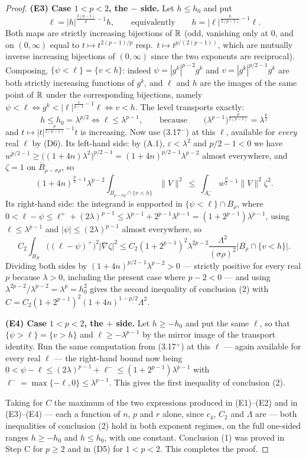 \begin{proof}
\textbf{(E3) Case $1<p<2$, the $-$ side.}  Let $h\le h_0$ and put
\[
\ell=|h|^{\frac{2(p-1)}p-1}h ,
\qquad\text{equivalently}\qquad
h=|\ell|^{\frac p{2(p-1)}-1}\ell .
\]
Both maps are strictly increasing bijections of $\mathbb{R}$ (odd, vanishing only at
$0$, and on $(0,\infty)$ equal to $t\mapsto t^{2(p-1)/p}$ resp.\
$t\mapsto t^{p/(2(p-1))}$, which are mutually inverse increasing bijections of
$(0,\infty)$ since the two exponents are reciprocal).  Composing,
$\{\psi<\ell\}=\{v<h\}$: indeed $\psi=|g^k|^{p-2}g^k$ and $v=|g^k|^{p/2-1}g^k$
are both strictly increasing functions of $g^k$, and $\ell$ and $h$ are the
images of the same point of $\mathbb{R}$ under the corresponding bijections, namely
$\psi<\ell\iff g^k<|\ell|^{\frac1{p-1}-1}\ell\iff v<h$.  The level transports
exactly:
\[
h\le h_0=\lambda^{p/2}\iff\ell\le\lambda^{p-1},
\qquad\text{because}\qquad
\bigl(\lambda^{p-1}\bigr)^{\frac p{2(p-1)}}=\lambda^{\frac p2}
\]
and $t\mapsto|t|^{\frac p{2(p-1)}-1}t$ is increasing.  Now use (3.17$^-$) at
this $\ell$, available for \emph{every} real $\ell$ by (D6).  Its left-hand
side: by (A.1), $\varepsilon<\lambda^2$ and $p/2-1<0$ we have
$w^{p/2-1}\ge\bigl((1+4n)\lambda^2\bigr)^{p/2-1}=(1+4n)^{p/2-1}\lambda^{p-2}$
almost everywhere, and $\zeta=1$ on $\overline B_{\rho-\sigma\rho}$, so
\[
(1+4n)^{\frac p2-1}\lambda^{p-2}
\int_{B_{\rho-\sigma\rho}\cap\{v<h\}}\|V\|^2
\ \le\ \int_{A^-_\ell}w^{\frac p2-1}\|V\|^2\zeta^2 .
\]
Its right-hand side: the integrand is supported in $\{\psi<\ell\}\cap B_\rho$,
where $0<\ell-\psi\le\ell^++(2\lambda)^{p-1}\le\lambda^{p-1}
+2^{p-1}\lambda^{p-1}=(1+2^{p-1})\lambda^{p-1}$, using $\ell\le\lambda^{p-1}$
and $|\psi|\le(2\lambda)^{p-1}$ almost everywhere, so
\[
C_2\int_{B_R}\bigl((\ell-\psi)^+\bigr)^2|\nabla\zeta|^2
\le C_2(1+2^{p-1})^2\lambda^{2p-2}\frac{\Lambda^2}{(\sigma\rho)^2}
\bigl|B_\rho\cap\{v<h\}\bigr| .
\]
Dividing both sides by $(1+4n)^{p/2-1}\lambda^{p-2}>0$ --- strictly positive for
every real $p$ because $\lambda>0$, including the present case where $p-2<0$ ---
and using $\lambda^{2p-2}/\lambda^{p-2}=\lambda^p=h_0^2$ gives the second
inequality of conclusion (2) with
$C=C_2(1+2^{p-1})^2(1+4n)^{1-p/2}\Lambda^2$.

\textbf{(E4) Case $1<p<2$, the $+$ side.}  Let $h\ge-h_0$ and put the same
$\ell$, so that $\{\psi>\ell\}=\{v>h\}$ and $\ell\ge-\lambda^{p-1}$ by the
mirror image of the transport identity.  Run the same computation from
(3.17$^+$) at this $\ell$ --- again available for every real $\ell$ --- the
right-hand bound now being
$0<\psi-\ell\le(2\lambda)^{p-1}+\ell^-\le(1+2^{p-1})\lambda^{p-1}$ with
$\ell^-=\max\{-\ell,0\}\le\lambda^{p-1}$.  This gives the first inequality of
conclusion (2).

Taking for $C$ the maximum of the two expressions produced in (E1)--(E2) and in
(E3)--(E4) --- each a function of $n$, $p$ and $r$ alone, since $c_4$, $C_2$ and
$\Lambda$ are --- both inequalities of conclusion (2) hold in both exponent
regimes, on the full one-sided ranges $h\ge-h_0$ and $h\le h_0$, with one
constant.  Conclusion (1) was proved in Step C for $p\ge2$ and in (D5) for
$1<p<2$.  This completes the proof.
\end{proof}

